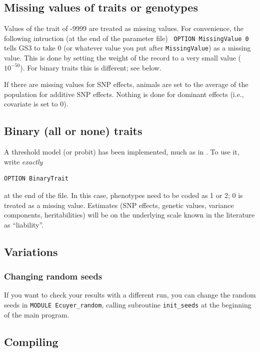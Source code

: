 \documentclass[a4paper,12pt,titlepage]{article}      %
\newcommand{\tm}{\texttt} %
\begin{document}
\subsection{Missing values of traits or genotypes}
Values of the trait of -9999 are treated as missing values. For convenience, the following intruction (at the end of the parameter file)
\tm{ OPTION MissingValue 0 }
tells GS3 to take 0 (or whatever value you put after \tm{MissingValue}) as a missing value. This is done by setting the weight of the record to a very small value ($10^{-50}$). For binary traits this is different; see below.

If there are missing values for SNP effects, animals are set to the average of the population for additive SNP effects. Nothing is done for dominant effects (i.e., covariate is set to 0).

\subsection{Binary (all or none) traits}
A threshold model (or probit) has been implemented, much as in \cite{Sorensen2002}. To use it, write \emph{exactly}
\begin{verbatim}
OPTION BinaryTrait
\end{verbatim}
at the end of the file. In this case, phenotypes need to be coded as 1 or 2; 0 is treated as a missing value. Estimates (SNP effects, genetic values, variance components, heritabilities) will be on the underlying scale known in the literature as ``liability''.


\subsection{Variations}

  \subsubsection{Changing random seeds}
  If you want to check your results with a different run, you can change the random seeds in 
  \verb|MODULE Ecuyer_random|, calling subroutine \verb|init_seeds| at the beginning of the main program.

\subsection{Compiling}
\end{document}
